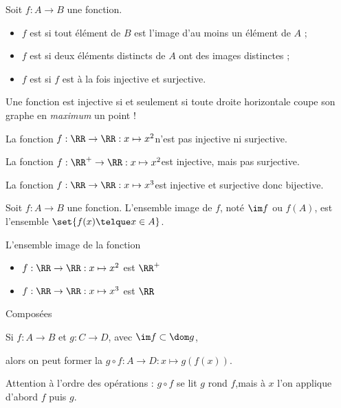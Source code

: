 \begin{frame}
  Soit $f : A \to B$ une fonction.
  \begin{itemize}
  \item $f$ est  si tout élément de $B$ est l'image d'au moins un élément de $A$ ;
  \item $f$ est  si deux éléments distincts de $A$ ont des images distinctes ;
  \item $f$ est  si $f$ est à la fois injective et surjective.
  \end{itemize}\pause

  \begin{remark}
    Une fonction est injective si et seulement si toute droite horizontale coupe son graphe en \emph{maximum} un point !
  \end{remark}

  \begin{example}
    La fonction \(f : \RR \to \RR : x \mapsto x^{2}\)\pause n'est pas injective \pause ni surjective.\pause

    La fonction \(f : \RR^{+} \to \RR : x \mapsto x^{2}\)\pause est injective\pause, mais pas surjective.\pause

    La fonction \(f : \RR \to \RR : x \mapsto x^{3}\)\pause est injective \pause et surjective \pause donc bijective.
  \end{example}
\end{frame}

\begin{frame}
  Soit \(f : A \to B\) une fonction. L'ensemble image de \(f\), noté \(\im f\) ou \(f(A)\), est l'ensemble \(\set{f(x) \telque x \in A}\).

  L'ensemble image de la fonction
  \begin{itemize}
  \item \(f : \RR \to \RR : x \mapsto x^{2}\) est \(\RR^+\)\pause
  \item \(f : \RR \to \RR : x \mapsto x^{3}\) est \(\RR\)
  \end{itemize}
\end{frame}

\begin{frame}{Composées}
  \begin{definition}
    Si \(f : A \to B\) et \(g : C \to D\), avec \(\im f \subset \dom g\),\pause

    alors on peut former la  \(g \circ f : A \to D : x \mapsto g(f(x))\).
  \end{definition}

  \begin{remark}
    Attention à l'ordre des opérations : \(g \circ f\) se lit \og \(g\) rond \(f\)\fg{},\pause mais à \(x\) l'on applique d'abord \(f\) puis \(g\).
  \end{remark}
\end{frame}

